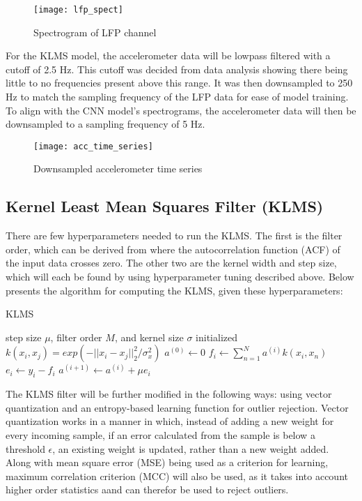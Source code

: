\documentclass[12pt]{article}
\begin{document}
\begin{figure}[h]
\caption{Spectrogram of LFP channel}
\centering
\texttt{[image: lfp\_spect]}
\end{figure}

For the KLMS model, the accelerometer data will be lowpass filtered with a cutoff of 2.5 Hz. This cutoff was decided from data analysis showing there being little to no frequencies present above this range. It was then downsampled to 250 Hz to match the sampling frequency of the LFP data for ease of model training. To align with the CNN model's spectrograms, the accelerometer data will then be downsampled to a sampling frequency of 5 Hz.

\begin{figure}[h]
\caption{Downsampled accelerometer time series}
\centering
\texttt{[image: acc\_time\_series]}
\label{acc_time_series}
\end{figure}

\subsection{Kernel Least Mean Squares Filter (KLMS)}

There are few hyperparameters needed to run the KLMS. The first is the filter order, which can be derived from where the autocorrelation function (ACF) of the input data crosses zero. The other two are the kernel width and step size, which will each be found by using hyperparameter tuning described above. Below presents the algorithm for computing the KLMS, given these hyperparameters:

\begin{algorithm}
\caption{KLMS}\label{alg:cap}
\begin{algorithmic}
   \Require step size $\mu$, filter order $M$, and kernel size
   $\sigma$ initialized  
   \State $k(x_i, x_j) = exp(-|| x_i - x_j ||^2_2 / \sigma^2_x)$
   \State $a^{(0)} \gets 0$  
     \State $f_i \gets \sum_{n=1}^{N} a^{(i)} k(x_i, x_n)$\   
     \State $e_i \gets y_i - f_i$    
     \State $a^{(i+1)} \gets a^{(i)} + \mu e_i$   
   \EndFor 
\end{algorithmic}
\end{algorithm}

The KLMS filter will be further modified in the following ways: using vector quantization and an entropy-based learning function for outlier rejection. Vector quantization works in a manner in which, instead of adding a new weight for every incoming sample, if an error calculated from the sample is below a threshold $\epsilon$, an existing weight is updated, rather than a new weight added. Along with mean square error (MSE) being used as a criterion for learning, maximum correlation criterion (MCC) will also be used, as it takes into account higher order statistics aand can therefor be used to reject outliers.
\end{document}
